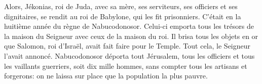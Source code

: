 Alors, Jékonias, roi de Juda,
	avec sa mère, ses serviteurs, ses officiers et ses dignitaires,
	se rendit au roi de Babylone, qui les fit prisonniers.
C’était en la huitième année du règne de Nabucodonosor.
Celui-ci emporta tous les trésors de la maison du Seigneur avec ceux de la maison du roi.
Il brisa tous les objets en or
	que Salomon, roi d’Israël, avait fait faire pour le Temple.
	Tout cela, le Seigneur l’avait annoncé.
Nabucodonosor déporta tout Jérusalem,
	tous les officiers et tous les vaillants guerriers, soit dix mille hommes,
	sans compter tous les artisans et forgerons:
	on ne laissa sur place que la population la plus pauvre.
